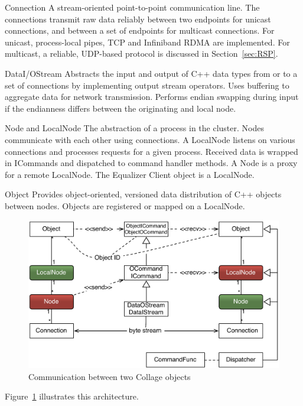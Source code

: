 \documentclass[10pt,journal,compsoc]{IEEEtran}
\newcommand{\sref}[1]{Section~\ref{#1}}
\newcommand{\fig}[1]{Figure~\ref{#1}}
\begin{document}
\begin{compactdesc}
\item[Connection] A stream-oriented point-to-point communication
  line. The connections
  transmit raw data reliably between two endpoints for unicast connections, and
  between a set of endpoints for multicast connections. For unicast,
  process-local pipes, TCP and Infiniband RDMA are implemented. For multicast,
  a reliable, UDP-based protocol is discussed in \sref{sec:RSP}.
\item[DataI/OStream] Abstracts the input and output of C++ data types from or to
  a set of connections by implementing output stream operators. Uses buffering
  to aggregate data for network transmission. Performs endian swapping during
  input if the endianness differs between the originating and local node.
\item[Node and LocalNode] The abstraction of a process in the cluster. Nodes
  communicate with each other using connections. A LocalNode listens on various
  connections and processes requests for a given process. Received data is
  wrapped in ICommands and dispatched to command handler methods. A Node is a
  proxy for a remote LocalNode. The Equalizer Client object is a LocalNode.
\item[Object] Provides object-oriented, versioned data distribution of C++
  objects between nodes. Objects are registered or mapped on a Local\-Node.
\end{compactdesc}

\begin{figure}[ht]\center
  \includegraphics[width=\columnwidth]{images/netObject}
  \caption{\label{fNetObject}Communication between two Collage objects}
\end{figure}
\fig{fNetObject} illustrates this architecture.
\end{document}
